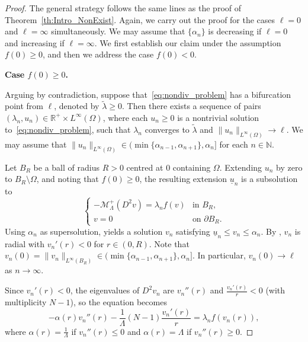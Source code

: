 \documentclass[10pt,twoside,english,reqno,a4paper]{amsart}
\theoremstyle{plain}
\theoremstyle{plain}
\theoremstyle{definition}
\theoremstyle{remark}
\numberwithin{equation}{section}
\newcommand{\N}{\mathbb{N}}
\newcommand{\R}{\mathbb{R}}
\def\lio{{L^{\infty}(\Omega)}}
\begin{document}
\begin{proof}
The general strategy follows the same lines as the proof of Theorem~\ref{th:Intro_NonExist}.
Again, we carry out the proof for the cases $\ell=0$ and $\ell=\infty$ simultaneously. We may assume that $\{\alpha_n\}$ is decreasing if $\ell=0$ and increasing if $\ell=\infty$. We first establish our claim under the assumption $f(0)\geq 0$, and then we address the case $f(0)<0$.
\smallskip

\textbf{Case $f(0)\geq 0$.}

Arguing by contradiction, suppose that~\eqref{eq:nondiv_problem} has a bifurcation point from $\ell$, denoted by $\tilde\lambda \geq 0$. Then there exists a sequence of pairs $(\lambda_n, u_n) \in \R^+\times \lio$, where each $u_n\geq 0$ is a nontrivial solution to~\eqref{eq:nondiv_problem}, such that $\lambda_n$ converges to $\tilde\lambda$ and $\|u_n\|_\lio\to \ell$. We may assume that $\|u_n\|_\lio\in (\min\{\alpha_{n-1}, \alpha_{n+1}\}, \alpha_n]$ for each $n\in\N$.

Let $B_R$ be a ball of radius $R>0$ centred at $0$ containing $\Omega$. Extending $u_n$ by zero to $B_R\setminus\Omega$, and noting that $f(0) \geq 0$, the resulting extension $\underline{u}_n$ is a subsolution to
\begin{equation*}
	\begin{cases}
		-\mathcal{M}^+_{\Lambda}(D^2v) = \lambda_n f(v) & \text{in } B_R,\\
		v=0 & \text{on } \partial B_R.
	\end{cases}
\end{equation*}
Using $\alpha_{n}$ as supersolution, \cite[Theorem 2.3.1]{Sat73} yields a solution $v_n$ satisfying $\underline{u}_n \leq v_n \leq \alpha_n$. By \cite{DS07}, $v_n$ is radial with $v_n'(r) < 0$ for $r \in (0, R)$. Note that $v_n(0)=\|v_n\|_{L^\infty(B_R)} \in (\min\{\alpha_{n-1}, \alpha_{n+1}\}, \alpha_n]$. In particular, $v_n(0)\to \ell$ as $n \to \infty$.

Since $v_n'(r) < 0$, the eigenvalues of $D^2v_n$ are $v_n''(r)$ and $\frac{v_n'(r)}{r} < 0$ (with multiplicity $N-1$), so the equation becomes
\begin{equation}\label{eq:radial_var}
-\alpha(r) v_n''(r) - \frac{1}{\Lambda}(N-1)\frac{v_n'(r)}{r} = \lambda_n f(v_n(r)),
\end{equation}
where $\alpha(r) = \frac{1}{\Lambda}$ if $v_n''(r) \leq 0$ and $\alpha(r) = \Lambda$ if $v_n''(r) \geq 0$.


\end{proof}
\end{document}
